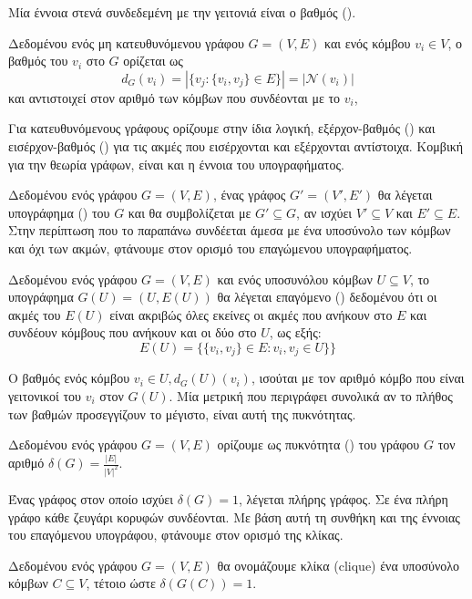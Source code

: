 Μία έννοια στενά συνδεδεμένη με την γειτονιά είναι ο βαθμός ().
\begin{definition}[Βαθμός]
Δεδομένου ενός μη κατευθυνόμενου γράφου $G = ( V, E )$ και ενός κόμβου $v_{i} \in V$, ο βαθμός του $v_{i}$ στο $G$ ορίζεται ως $$d_{G} ( v_{i} ) = |\{ v_{j} : \{ v_{i} , v_{j} \} \in E \}| = |\mathcal{N} ( v_{i} )|$$ και αντιστοιχεί στον αριθμό των κόμβων που συνδέονται με το $v_{i}$,
\end{definition}
Για κατευθυνόμενους γράφους ορίζουμε στην ίδια λογική, εξέρχον-βαθμός () και εισέρχον-βαθμός () για τις ακμές που εισέρχονται και εξέρχονται αντίστοιχα.
Κομβική για την θεωρία γράφων, είναι και η έννοια του υπογραφήματος.
\begin{definition}[Υπογράφημα]
Δεδομένου ενός γράφου $G = ( V, E )$, ένας γράφος $G' = ( V', E')$ θα λέγεται υπογράφημα () του $G$ και θα συμβολίζεται με $G' \subseteq G$, αν ισχύει $V' \subseteq V$ και $E' \subseteq E$.
\label{def:subgraph}
Στην περίπτωση που το παραπάνω συνδέεται άμεσα με ένα υποσύνολο των κόμβων και όχι των ακμών, φτάνουμε στον ορισμό του επαγώμενου υπογραφήματος.
\end{definition}
\begin{definition}
Δεδομένου ενός γράφου $G = ( V, E )$ και ενός υποσυνόλου κόμβων $U \subseteq V$, το υπογράφημα $G(U) = (U, E(U))$ θα λέγεται επαγόμενο () δεδομένου ότι οι ακμές του $E(U)$ είναι ακριβώς όλες εκείνες οι ακμές που ανήκουν στο $E$ και συνδέουν κόμβους που ανήκουν και οι δύο στο $U$, ως εξής:
\begin{equation}
    E(U) = \{\{v_{i},v_{j}\}\in E: v_{i}, v_{j}\in U\}\}
\end{equation}
\label{def:induced_subgraph}
\end{definition}
Ο βαθμός ενός κόμβου $v_{i} \in U, d_{G}(U)(v_{i})$, ισούται με τον αριθμό κόμβο που είναι γειτονικοί του $v_{i}$ στον $G(U)$.
Μία μετρική που περιγράφει συνολικά αν το πλήθος των βαθμών προσεγγίζουν το μέγιστο, είναι αυτή της πυκνότητας.
\begin{definition}[Πυκνότητα]
Δεδομένου ενός γράφου $G = ( V, E )$ ορίζουμε ως πυκνότητα () του γράφου $G$ τον αριθμό $\delta(G) = \frac{|E|}{|V|^{2}}$.
\end{definition}
Ένας γράφος στον οποίο ισχύει $\delta(G) = 1$, λέγεται πλήρης γράφος.
Σε ένα πλήρη γράφο κάθε ζευγάρι κορυφών συνδέονται.
Με βάση αυτή τη συνθήκη και της έννοιας του επαγόμενου υπογράφου, φτάνουμε στον ορισμό της κλίκας.
\begin{definition}[Κλίκα]
Δεδομένου ενός γράφου $G = ( V, E )$ θα ονομάζουμε κλίκα (clique) ένα υποσύνολο κόμβων $C \subseteq V$, τέτοιο ώστε $\delta(G(C)) = 1$.
\end{definition}

